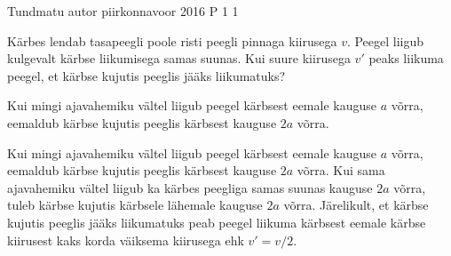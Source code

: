 {Tundmatu autor} %
{piirkonnavoor} %
{2016} %
{P 1} %
{1} %
{
\ifStatement
Kärbes lendab tasapeegli poole risti peegli pinnaga kiirusega $v$. Peegel liigub kulgevalt kärbse liikumisega samas suunas. Kui suure kiirusega $v'$ peaks liikuma peegel, et kärbse kujutis peeglis jääks liikumatuks?
\fi

\ifHint
Kui mingi ajavahemiku vältel liigub peegel kärbsest eemale kauguse $a$ võrra, eemaldub kärbse kujutis peeglis kärbsest kauguse $2a$ võrra.
\fi

\ifSolution
Kui mingi ajavahemiku vältel liigub peegel kärbsest eemale kauguse $a$ võrra, eemaldub kärbse kujutis peeglis kärbsest kauguse $2a$ võrra. Kui sama ajavahemiku vältel liigub ka kärbes peegliga samas suunas kauguse $2a$ võrra, tuleb kärbse kujutis kärbsele lähemale kauguse $2a$ võrra. Järelikult, et kärbse kujutis peeglis jääks liikumatuks peab peegel liikuma kärbsest eemale kärbse kiirusest kaks korda väiksema kiirusega ehk $v'=v/2$.
\fi
}